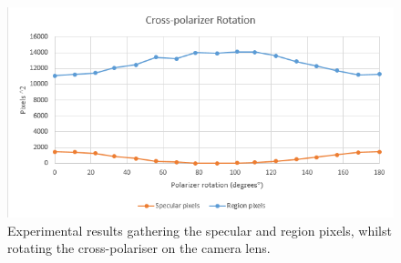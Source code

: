 \documentclass[fleqn,twoside]{article}
\begin{document}
\begin{figure}[h]
	\centering
	\includegraphics[width=.7\linewidth]{polarizer_rot.png}
	\caption{Experimental results gathering the specular and region pixels, whilst rotating the cross-polariser on the camera lens.}
	\label{fig:graph_polar}
\end{figure}
\end{document}
